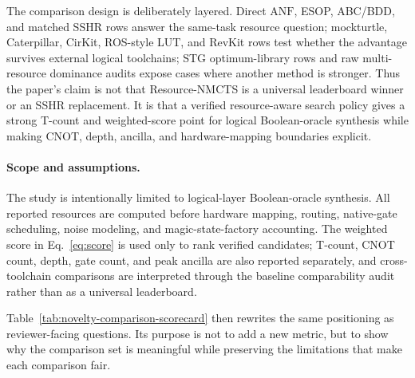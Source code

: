 \documentclass[11pt]{article}
\newcommand{\method}{Resource-NMCTS}
\newcommand{\anf}{\ensuremath{\mathrm{ANF}}}
\begin{document}
The comparison design is deliberately layered.  Direct \anf{}, ESOP,
ABC/BDD, and matched SSHR rows answer the same-task resource question;
mockturtle, Caterpillar, CirKit, ROS-style LUT, and RevKit rows test whether
the advantage survives external logical toolchains; STG optimum-library rows
and raw multi-resource dominance audits expose cases where another method is
stronger.  Thus the paper's claim is not that \method{} is a universal
leaderboard winner or an SSHR replacement.  It is that a verified
resource-aware search policy gives a strong T-count and weighted-score point
for logical Boolean-oracle synthesis while making CNOT, depth, ancilla, and
hardware-mapping boundaries explicit.

\paragraph{Scope and assumptions.}
The study is intentionally limited to logical-layer Boolean-oracle synthesis.
All reported resources are computed before hardware mapping, routing,
native-gate scheduling, noise modeling, and magic-state-factory accounting.
The weighted score in Eq.~\eqref{eq:score} is used only to rank verified
candidates; T-count, CNOT count, depth, gate count, and peak ancilla are also
reported separately, and cross-toolchain comparisons are interpreted through
the baseline comparability audit rather than as a universal leaderboard.

\begin{table}[H]
\centering
\scriptsize
\setlength{\tabcolsep}{2pt}
\renewcommand{\arraystretch}{1.05}
\caption{Contribution-to-evidence map.  Each contribution is tied to concrete
implementation mechanisms, paper evidence, and the boundary that prevents the
claim from being overstated.}
\label{tab:contribution-map}

\end{table}

Table~\ref{tab:novelty-comparison-scorecard} then rewrites the same positioning
as reviewer-facing questions.  Its purpose is not to add a new metric, but to
show why the comparison set is meaningful while preserving the limitations that
make each comparison fair.

\begin{table}[H]
\centering
\scriptsize
\setlength{\tabcolsep}{2pt}
\renewcommand{\arraystretch}{1.05}
\caption{Novelty and comparison scorecard.  Each row answers a reviewer-facing
comparison or novelty concern, points to the manuscript evidence, and states the
boundary that prevents overclaiming.}
\label{tab:novelty-comparison-scorecard}

\end{table}
\end{document}
